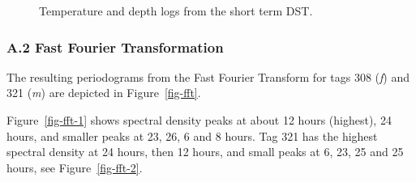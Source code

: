 \documentclass[
  authoryear,
  review,
  3p]{elsarticle}
\begin{document}
\begin{figure}
\begin{minipage}[t]{0.50\linewidth}
{\centering 


}

\end{minipage}%
%
\begin{minipage}[t]{0.50\linewidth}

{\centering 


}

\end{minipage}%

\caption{\label{fig-dstannex}Temperature and depth logs from the short
term DST.}

\end{figure}

\hypertarget{a.2-fast-fourier-transformation}{%
\subsubsection*{\texorpdfstring{\textbf{A.2} Fast Fourier
Transformation}{A.2 Fast Fourier Transformation}}\label{a.2-fast-fourier-transformation}}

The resulting periodograms from the Fast Fourier Transform for tags 308
(\emph{f}) and 321 (\emph{m}) are depicted in Figure~\ref{fig-fft}.

Figure~\ref{fig-fft-1} shows spectral density peaks at about 12 hours
(highest), 24 hours, and smaller peaks at 23, 26, 6 and 8 hours. Tag 321
has the highest spectral density at 24 hours, then 12 hours, and small
peaks at 6, 23, 25 and 25 hours, see Figure~\ref{fig-fft-2}.
\end{document}
